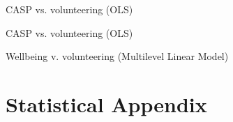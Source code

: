 \documentclass[10pt, letterpaper]{article}
\begin{document}
\begin{spacing}{1.4}
\begin{spacing}{.9}

%	 

\begin{spacing}{.9}
	 
      \label{tauLS} 
\end{spacing}



\begin{spacing}{.9}
\begin{table}[H]
\centering 
\caption{CASP vs. volunteering (OLS)}  
\begin{scriptsize} 
	 
      \label{SepMod} 
\end{scriptsize}
\end{table}
\end{spacing}

\begin{spacing}{.9}
\begin{table}[H]
\centering 
\caption{CASP vs. volunteering (OLS)}  
\begin{scriptsize} 
	 
      \label{SepMod1} 
\end{scriptsize}
\end{table}
\end{spacing}




\begin{spacing}{.9}
\begin{table}[H]
\centering 
\caption{Wellbeing v. volunteering (Multilevel Linear Model)}  
\begin{scriptsize} 
	 
      \label{regB} 
\end{scriptsize}
\end{table}
\end{spacing}





\section{Statistical Appendix}


\end{spacing}
\end{spacing}
\end{document}
